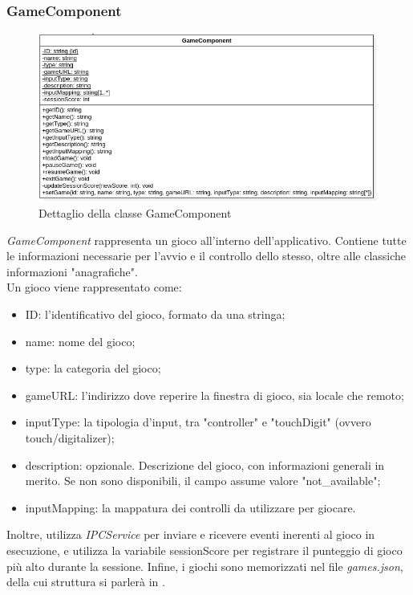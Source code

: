 \subsubsection{GameComponent}
\label{subsec:gameComponent}
\begin{figure}[h]
    \centering
    \includegraphics[width=340pt]{images/prog/Game.png}
    \caption{Dettaglio della classe GameComponent}
    \label{fig:gameComponent}
\end{figure}
\emph{GameComponent} rappresenta un gioco all'interno dell'applicativo. Contiene tutte le informazioni necessarie per l'avvio e il controllo dello stesso, oltre alle classiche informazioni "anagrafiche".\\
Un gioco viene rappresentato come:
\begin{itemize}
    \item ID: l'identificativo del gioco, formato da una stringa;
    \item name: nome del gioco;
    \item type: la categoria del gioco;
    \item gameURL: l'indirizzo dove reperire la finestra di gioco, sia locale che remoto;
    \item inputType: la tipologia d'input, tra "controller" e "touchDigit" (ovvero touch/digitalizer);
    \item description: opzionale. Descrizione del gioco, con informazioni generali in merito. Se non sono disponibili, il campo assume valore "not_available";
    \item inputMapping: la mappatura dei controlli da utilizzare per giocare.
\end{itemize}
Inoltre, utilizza \emph{IPCService} per inviare e ricevere eventi inerenti al gioco in esecuzione, e utilizza la variabile sessionScore per registrare il punteggio di gioco più alto durante la sessione.
Infine, i giochi sono memorizzati nel file \emph{games.json}, della cui struttura si parlerà in . 
\newpage
